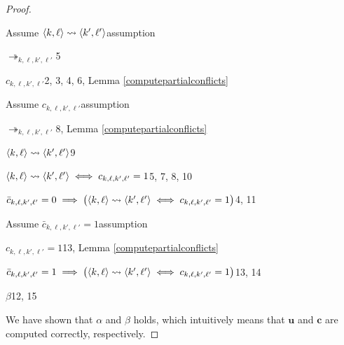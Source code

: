 \begin{proof}
\begin{enumerate}
			\item Assume $c_{k,\ell,k',\ell'}$\hfill assumption
			\item $\langle{k},{\ell}\rangle\rightsquigarrow\langle{k'},{\ell'}\rangle\iff c_{k,\ell,k',\ell'}=1$\hfill 5, 7, 8, 10
		\end{level}
		\item $\bar{c}_{k,\ell,k',\ell'}=0\implies\big(\langle{k},{\ell}\rangle\rightsquigarrow\langle{k'},{\ell'}\rangle\iff c_{k,\ell,k',\ell'}=1\big)$\hfill 4, 11
		\item Assume $\bar{c}_{k,\ell,k',\ell'}=1$\hfill assumption
		\begin{level}
			\item $c_{k,\ell,k',\ell'}=1$\hfill 13, Lemma \ref{computepartialconflicts}
		\end{level}
		\item $\bar{c}_{k,\ell,k',\ell'}=1\implies\big(\langle{k},{\ell}\rangle\rightsquigarrow\langle{k'},{\ell'}\rangle\iff c_{k,\ell,k',\ell'}=1\big)$\hfill 13, 14
		\item $\beta$\hfill 12, 15
	\end{enumerate}

	We have shown that $\alpha$ and $\beta$ holds, which intuitively means that $\mathbf{u}$ and $\mathbf{c}$ are computed correctly, respectively.
\end{proof}
